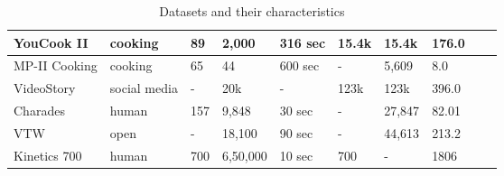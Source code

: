 \begin{table}[H]
\begin{tabular}{|l|l|l|l|l|l|l|l|l|l|}
		YouCook II                                                 & cooking         & 89                 & 2,000             & 316 sec          & 15.4k            & 15.4k           &  176.0              \\ \hline
		MP-II Cooking                                              & cooking         & 65                 & 44                & 600 sec          & -                & 5,609           &  8.0                \\ \hline
		VideoStory                                                 & social media    & -                  & 20k               & -                & 123k             & 123k            &  396.0              \\ \hline
		Charades                                                   & human           & 157                & 9,848             & 30 sec           & -                & 27,847          &  82.01              \\ \hline
		VTW                                                        & open            & -                  & 18,100            & 90 sec           & -                & 44,613          &  213.2              \\ \hline
		Kinetics 700                                               & human           & 700                & 6,50,000          & 10 sec           & 700              & -               &  1806               \\ \hline
	\end{tabular}

\centering
\caption{Datasets and their characteristics}
\label{tab: datasets}

\end{table}
